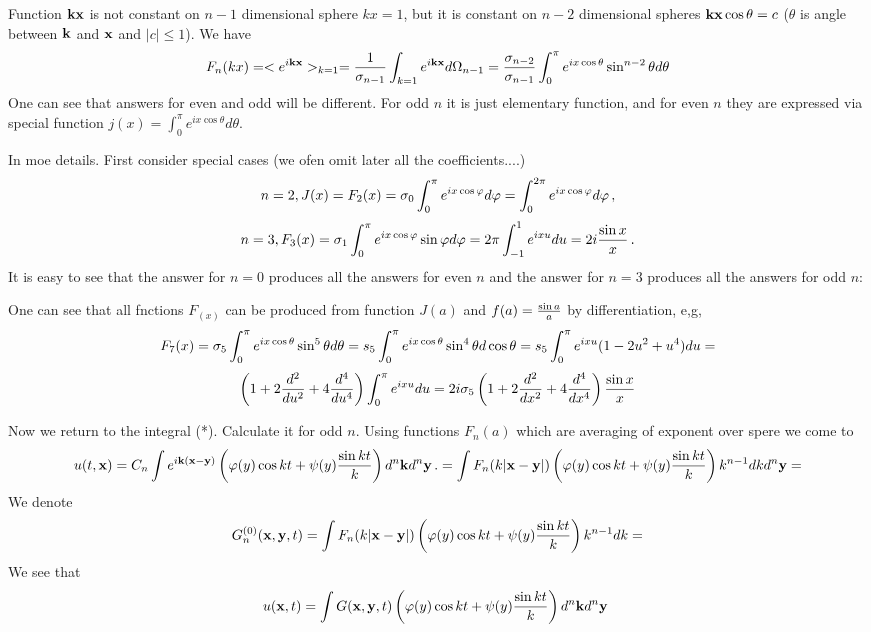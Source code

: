    Function ${\bf k}{\bf x}$  is not constant on $n-1$ dimensional sphere $kx=1$,
but it is constant on $n-2$ dimensional spheres ${\bf k}{\bf x}\cos\theta=c$
($\theta$ is angle between ${\bf k}$ and ${\bf x}$ and $|c|\leq 1$).
  We have
    $$
F_n(kx)= <e^{i{\bf k} {\bf x}}>_{k=1}
  ={1\over {\sigma}_{n-1}}
  \int_{k=1} e^{i{\bf k}{\bf x}} d\Omega_{n-1}=
      {{\sigma}_{n-2}\over {\sigma}_{n-1}}
   \int_0^\pi e^{ix\cos\theta}\sin^{n-2}\theta d\theta
      $$
One can see that answers for even and odd will be different.
   For odd $n$ it is just elementary function, and 
   for even $n$ they are expressed via special function
   $j(x)=\int_0^\pi e^{ix\cos\theta}d\theta$.
   
In moe details.
 First consider special cases
(we ofen omit later all the coefficients....)
         $$
n=2, J(x)=F_2(x)={\sigma}_0\int_0^{\pi} e^{ix\cos\varphi}d\varphi=
        \int_0^{2\pi} e^{ix\cos\varphi}d\varphi\,,
         $$ 
         $$
n=3, F_3(x)={\sigma}_1\int_0^{\pi} e^{ix\cos\varphi}\sin \varphi d\varphi=
        2\pi\int_{-1}^{1} e^{ix u}du=2i{\sin x\over x}\,.
         $$ 
It is easy to see that the answer for $n=0$ produces all the answers
for even $n$ and the answer for $n=3$ produces all the answers for
odd $n$:


   One can see that all fnctions $F_(x)$ can be produced from function
$J(a)$ and $f(a)={\sin a\over a}$ by differentiation, e,g,
                     $$
      F_7(x)={\sigma}_{5}
   \int_0^\pi e^{ix\cos\theta}\sin^{5}\theta d\theta=
   s_5\int_0^\pi e^{ix\cos\theta}\sin^{4}\theta d\cos\theta=
   s_5\int_0^\pi e^{ix u}(1-2u^2+u^4)du=
         $$
            $$
\left(1+2{d^2\over du^2}+4{d^4\over du^4}\right)
        \int_0^\pi e^{ix u}du=
2i{\sigma}_5\left(1+2{d^2\over dx^2}+4{d^4\over dx^4}\right)
        {\sin x\over x}
           $$

Now we return to the integral (*). Calculate it for odd $n$.
Using functions $F_n(a)$  which are averaging
of exponent over spere we come to
               $$
  u(t,{\bf x})=C_n\int e^{i{\bf k} ({\bf x}-{\bf y})}\left(\varphi(y)\cos kt+
       \psi(y){\sin kt\over k}\right)d^n{\bf k} d^n{\bf y}\,.
           =\int F_n(k|{\bf x}-{\bf y}|)\left(\varphi(y)\cos kt+
       \psi(y){\sin kt\over k}\right)k^{n-1}dk d^n {\bf y}=
              $$
We denote
             $$
     G^{(0)}_n({\bf x},{\bf y},t)=
   \int F_n(k|{\bf x}-{\bf y}|)\left(\varphi(y)\cos kt+
       \psi(y){\sin kt\over k}\right)k^{n-1}dk =
             $$
We see that
        $$
   u({\bf x},t)=
    \int G({\bf x},{\bf y},t)
    \left(\varphi(y)\cos kt+
       \psi(y){\sin kt\over k}\right)d^n{\bf k} d^n{\bf y}\
        $$
\bye
